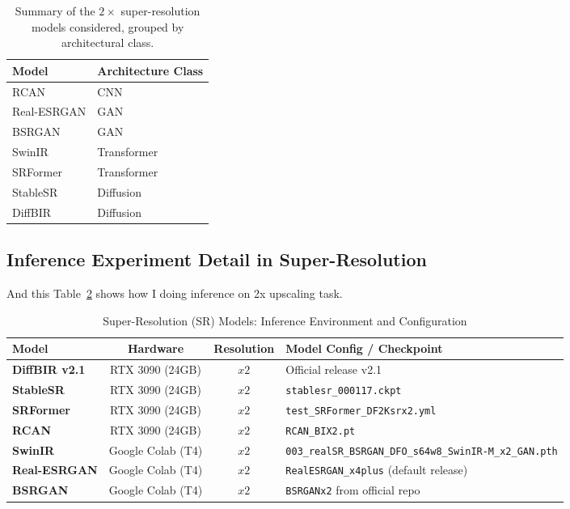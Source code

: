\begin{table}[t]
    \centering
    \caption{Summary of the $2\times$ super-resolution models considered, grouped by architectural class.}
    \label{tab:sr_models}
    \begin{tabular}{ll}
        \toprule
        \textbf{Model} & \textbf{Architecture Class} \\ 
        \midrule
        RCAN & CNN \\[2pt]
        Real-ESRGAN & GAN \\[2pt]
        BSRGAN & GAN \\[2pt]
        SwinIR & Transformer \\[2pt]
        SRFormer & Transformer \\[2pt]
        StableSR & Diffusion \\[2pt]
        DiffBIR & Diffusion \\ 
        \bottomrule
    \end{tabular}
\end{table}

\subsection{Inference Experiment Detail in Super-Resolution}
And this Table~\ref{tab:sr_inference_env} shows how I doing inference on 2x upscaling task.


\begin{table}[h]
\centering
\caption{Super-Resolution (SR) Models: Inference Environment and Configuration}
\label{tab:sr_inference_env}
\begin{tabular}{lccp{5cm}}
\toprule
\textbf{Model} & \textbf{Hardware} & \textbf{Resolution} & \textbf{Model Config / Checkpoint} \\
\midrule
\textbf{DiffBIR v2.1} & RTX 3090 (24GB) & $x2$ & Official release v2.1 \\
\textbf{StableSR} & RTX 3090 (24GB) & $x2$ & \texttt{stablesr\_000117.ckpt} \\
\textbf{SRFormer} & RTX 3090 (24GB) & $x2$ & \texttt{test\_SRFormer\_DF2Ksrx2.yml} \\
\textbf{RCAN} & RTX 3090 (24GB) & $x2$ & \texttt{RCAN\_BIX2.pt} \\
\textbf{SwinIR} & Google Colab (T4) & $x2$ & \texttt{003\_realSR\_BSRGAN\_DFO\_s64w8\_SwinIR-M\_x2\_GAN.pth} \\
\textbf{Real-ESRGAN} & Google Colab (T4) & $x2$ & \texttt{RealESRGAN\_x4plus} (default release) \\
\textbf{BSRGAN} & Google Colab (T4) & $x2$ & \texttt{BSRGANx2} from official repo \\
\bottomrule
\end{tabular}
\end{table}


